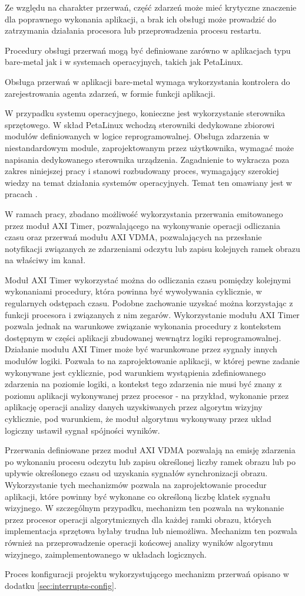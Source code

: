 Ze względu na charakter przerwań, część zdarzeń może mieć krytyczne znaczenie dla poprawnego wykonania aplikacji, a brak ich obsługi może prowadzić do zatrzymania działania procesora lub przeprowadzenia procesu restartu.

Procedury obsługi przerwań mogą być definiowane zarówno w aplikacjach typu bare-metal jak i w systemach operacyjnych, takich jak PetaLinux.

Obsługa przerwań w aplikacji bare-metal wymaga wykorzystania kontrolera do zarejestrowania agenta zdarzeń, w formie funkcji aplikacji.

W przypadku systemu operacyjnego, konieczne jest wykorzystanie sterownika sprzętowego. W skład PetaLinux wchodzą sterowniki dedykowane zbiorowi modułów definiowanych w logice reprogramowalnej. Obsługa zdarzenia w niestandardowym module, zaprojektowanym przez użytkownika, wymagać może napisania dedykowanego sterownika urządzenia. Zagadnienie to wykracza poza zakres niniejszej pracy i stanowi rozbudowany proces, wymagający szerokiej wiedzy na temat działania systemów operacyjnych. Temat ten omawiany jest w pracach \cite{Love2014,Corbet2005}.

W ramach pracy, zbadano możliwość wykorzystania przerwania emitowanego przez moduł AXI Timer, pozwalającego na wykonywanie operacji odliczania czasu oraz przerwań modułu AXI VDMA, pozwalających na przesłanie notyfikacji związanych ze zdarzeniami odczytu lub zapisu kolejnych ramek obrazu na właściwy im kanał.

Moduł AXI Timer wykorzystać można do odliczania czasu pomiędzy kolejnymi wykonaniami procedury, która powinna być wywoływania cyklicznie, w regularnych odstępach czasu. Podobne zachowanie uzyskać można korzystając z funkcji procesora i związanych z nim zegarów. Wykorzystanie modułu AXI Timer pozwala jednak na warunkowe związanie wykonania procedury z kontekstem dostępnym w części aplikacji zbudowanej wewnątrz logiki reprogramowalnej. Działanie modułu AXI Timer może być warunkowane przez sygnały innych modułów logiki. Pozwala to na zaprojektowanie aplikacji, w której pewne zadanie wykonywane jest cyklicznie, pod warunkiem wystąpienia zdefiniowanego zdarzenia na poziomie logiki, a kontekst tego zdarzenia nie musi być znany z poziomu aplikacji wykonywanej przez procesor - na przykład, wykonanie przez aplikację operacji analizy danych uzyskiwanych przez algorytm wizyjny cyklicznie, pod warunkiem, że moduł algorytmu wykonywany przez układ logiczny ustawił sygnał spójności wyników.

Przerwania definiowane przez moduł AXI VDMA pozwalają na emisję zdarzenia po wykonaniu procesu odczytu lub zapisu określonej liczby ramek obrazu lub po upływie określonego czasu od uzyskania sygnałów synchronizacji obrazu. Wykorzystanie tych mechanizmów pozwala na zaprojektowanie procedur aplikacji, które powinny być wykonane co określoną liczbę klatek sygnału wizyjnego. W szczególnym przypadku, mechanizm ten pozwala na wykonanie przez procesor operacji algorytmicznych dla każdej ramki obrazu, których implementacja sprzętowa byłaby trudna lub niemożliwa. Mechanizm ten pozwala również na przeprowadzenie operacji końcowej analizy wyników algorytmu wizyjnego, zaimplementowanego w układach logicznych.

Proces konfiguracji projektu wykorzystującego mechanizm przerwań opisano w dodatku \ref{sec:interrupts-config}.